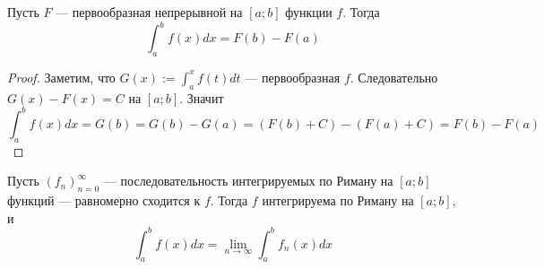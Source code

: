 \documentclass[12pt,a4paper]{article}
\begin{document}
    \begin{corollary}
        Пусть $F$ --- первообразная непрерывной на $[a; b]$ функции $f$. Тогда
        \[\int_a^b f(x)dx = F(b) - F(a)\]
    \end{corollary}

    \begin{proof}
        Заметим, что $G(x) := \int_a^x f(t)dt$ --- первообразная $f$. Следовательно $G(x) - F(x) = C$ на $[a; b]$. Значит
        \[\int_a^b f(x)dx = G(b) = G(b) - G(a) = (F(b) + C) - (F(a) + C) = F(b) - F(a)\]
    \end{proof}

    \begin{theorem}
        Пусть $(f_n)_{n=0}^\infty$ --- последовательность интегрируемых по Риману на $[a; b]$ функций --- равномерно сходится к $f$. Тогда $f$ интегрируема по Риману на $[a; b]$, и
        \[\int_a^b f(x)dx = \lim_{n \to \infty} \int_a^b f_n(x)dx\]
    \end{theorem}
\end{document}

